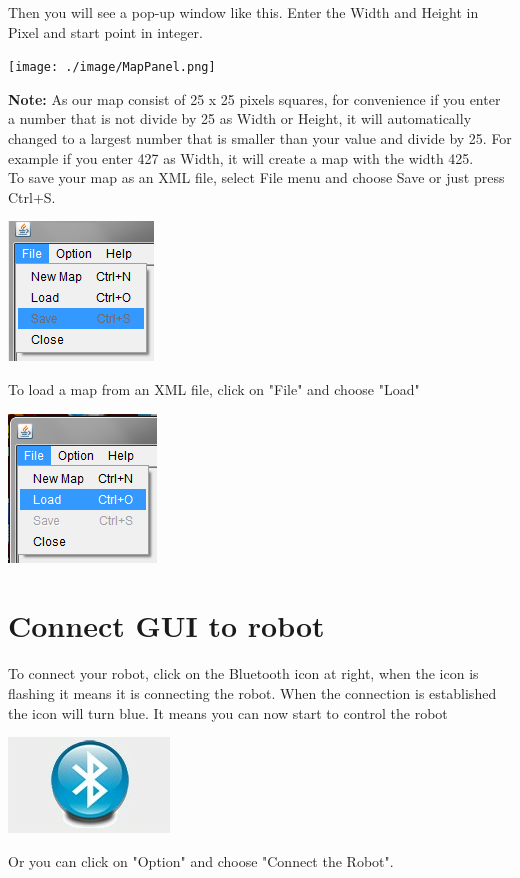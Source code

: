 \documentclass[11pt, a4paper]{report}
\begin{document}
Then you will see a pop-up window like this. Enter the Width and Height in Pixel and start point in integer.\\[1cm]
\begin{center}
\texttt{[image: ./image/MapPanel.png]}\\
\end{center}

\noindent\textbf {Note: } As our map consist of 25 x 25 pixels squares, for convenience if you enter a number that is not divide by 25 as Width or Height, it will automatically changed to a largest number that is smaller than your value and divide by 25. For example if you enter 427 as Width, it will create a map with the width 425.\\[1cm]

To save your map as an XML file, select File menu and choose Save or just press Ctrl+S.
\begin{center}
\includegraphics[scale=1]{./image/SaveMap.png}\\[1cm]
\end{center}

To load a map from an XML file, click on "File" and choose "Load"
\begin{center}
\includegraphics[scale=1]{./image/LoadMap.png}\\[1cm]
\end{center}

\section{Connect GUI to robot}
To connect your robot, click on the Bluetooth icon at right, when the icon is flashing it means it is connecting the robot. When the connection is established the icon will turn blue. It means you can now start to control the robot
\begin{center}
\includegraphics[scale=1]{./image/Bluetooth.png}\\[1cm]
\end{center}
Or you can click on "Option" and choose "Connect the Robot".\\
\end{document}
